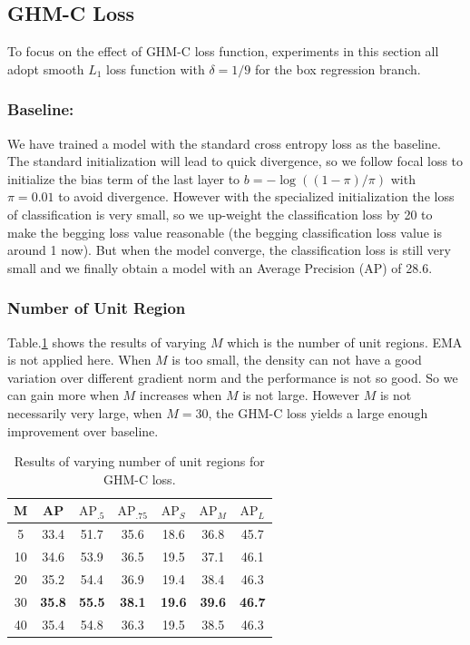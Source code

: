\documentclass[letterpaper]{article} %
\begin{document}
\subsection{GHM-C Loss}
To focus on the effect of  GHM-C loss function, experiments in this section all adopt smooth $L_1$ loss function with $\delta=1/9$ for the box regression branch. 

\subsubsection{Baseline:} We have trained a model with the standard cross entropy loss as the baseline. The standard initialization will lead to quick divergence, so we follow focal loss \cite{focal} to initialize the bias term of the last layer to $b = -\log((1-\pi)/\pi)$ with $\pi=0.01$ to avoid divergence. However with the specialized initialization the loss of classification is very small, so we up-weight the classification loss by 20 to make the begging loss value reasonable (the begging classification loss value is around 1 now). But when the model converge, the classification loss is still very small and we finally obtain a model with an Average Precision (AP) of 28.6.

\subsubsection{Number of Unit Region}
Table.\ref{tab:num} shows the results of varying $M$ which is the number of unit regions. EMA is not applied here. When $M$ is too small, the density can not have a good variation over different gradient norm and the performance is not so good. So we can gain more when $M$ increases when $M$ is not large. However $M$ is not necessarily very large, when $M = 30$, the GHM-C loss yields a large enough improvement over  baseline.
\begin{table}[!ht]
\begin{center}
\begin{tabular}{| c | c  c  c  c  c  c |}
\hline
M & AP & $\text{AP}_{.5}$ & $\text{AP}_{.75}$ & $\text{AP}_{S}$ & $\text{AP}_{M}$ & $\text{AP}_{L}$ \\
\hline
5 & 33.4 & 51.7 & 35.6 & 18.6 & 36.8 & 45.7 \\
10 & 34.6 & 53.9 & 36.5 & 19.5 & 37.1 & 46.1 \\
20 & 35.2 & 54.4 & 36.9 & 19.4 & 38.4 & 46.3 \\
30 & \textbf{35.8} & \textbf{55.5} & \textbf{38.1} & \textbf{19.6} & \textbf{39.6} & \textbf{46.7} \\
40 & 35.4 & 54.8 & 36.3 & 19.5 & 38.5 & 46.3 \\
\hline 
\end{tabular}
\caption{Results of varying number of unit regions for GHM-C loss.}
\label{tab:num}
\end{center}
\end{table}
\end{document}
